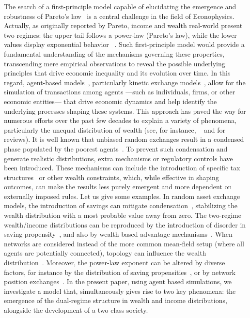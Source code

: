 \documentclass[11pt,a4paper]{revtex4-1}
\begin{document}
The search of a first-principle model capable of elucidating the emergence and robustness of Pareto's law~\cite{paretonovo} is a central challenge in the field of Econophysics. 
%
Actually, as originally reported by Pareto, income and wealth real-world  present two regimes: the upper tail follows a power-law (Pareto's law), while the lower values display exponential  behavior ~\cite{dragulescu2001,yakovenko2023}.
%
Such  first-principle model would provide a fundamental understanding of the mechanisms governing these properties, transcending mere empirical observations to reveal the possible underlying principles that drive economic inequality and its evolution over time.
%
In this regard, agent-based models~\cite{chakraborti2011}, 
particularly kinetic exchange models~\cite{metzler2023}, allow for the simulation of transactions among agents ---such as individuals, firms, or other economic entities--- that drive economic dynamics and help identify the underlying processes shaping these systems. 
This approach has paved the way for numerous efforts over the past few decades to explain a variety of phenomena, particularly the unequal distribution of wealth (see, for instance, ~\cite{boghosian2014a,metzler2019,chakraborti2000,dragulescu2000,bouchaud2000} and \cite{yakovenko2009,chakraborti2011,chakrabarti2013} for reviews).  
%
It is well known that unbiased random exchanges result in a condensed phase populated by the poorest agents~\cite{boghosian2014a, Cardoso2023}. To prevent such condensation and generate realistic distributions, extra mechanisms or regulatory controls have been introduced. These mechanisms can include the introduction of specific tax structures~\cite{LIMA2022,Calvelli2023,Dias2024} or other wealth constraints, which, while effective in shaping outcomes, can make the results less purely emergent and more dependent on externally imposed rules.
%
Let us give some examples.
In random asset exchange models, the  introduction of savings can mitigate condensation~\cite{chakraborti2000}, stabilizing the wealth distribution with a most probable value away from zero.
The 
two-regime wealth/income distributions can be reproduced by the introduction of disorder in saving propensity~\cite{ Chatterjee2004}, and also by wealth-based advantage mechanisms~\cite{Calvelli2023,Vallejos2018}.  
%
When networks are considered instead of the more common mean-field setup (where all agents are potentially connected), topology can influence the wealth distribution~\cite{KOHLRAUSCH2024}.
Moreover, the power-law exponent can be altered by diverse factors, for instance by the distribution of saving propensities~\cite{AYDINER2018}, or by network position exchanges~\cite{metzler2019}. 
In the present paper, using agent based simulations,  we investigate a model that,  simultaneously gives rise to two key phenomena: the emergence of the dual-regime structure in wealth and income distributions, alongside the development of a two-class society. 
\end{document}
